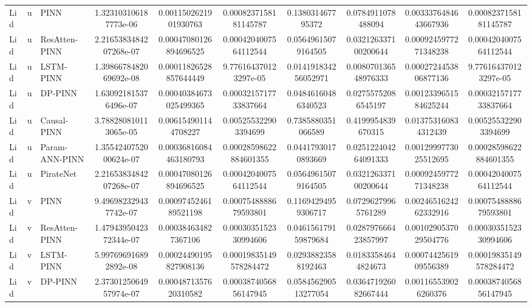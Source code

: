 \begin{landscape}
\begin{longtable}{lllccccccc}
\bottomrule
\endlastfoot
 Lid &     u &           PINN &  1.323103106187773e-06 &  0.0011502621901930763 &  0.0008237158181145787 &    0.138031467795372 &    0.0784911078488094 & 0.0033376484643667936 &  0.0008237158181145787 \\
 Lid &     u &  ResAtten-PINN & 2.2165383484207268e-07 & 0.00047080126894696525 &  0.0004204007564112544 &  0.05649615079164505 &  0.032126337100200644 & 0.0009245977271348238 &  0.0004204007564112544 \\
 Lid &     u &      LSTM-PINN & 1.3986678482069692e-08 & 0.00011826528857644449 &  9.776164370123297e-05 & 0.014191834256052971 &  0.008070136548976333 & 0.0002724453806877136 &  9.776164370123297e-05 \\
 Lid &     u &        DP-PINN &  1.630921815376496e-07 & 0.00040384673025499365 &  0.0003215717733837664 &  0.04846160486340523 &   0.02755752086545197 & 0.0012339651584625244 &  0.0003215717733837664 \\
 Lid &     u &    Causal-PINN &  3.788280810113065e-05 &   0.006154901144708227 &   0.005255322903394699 &   0.7385880351066589 &    0.4199954839670315 &  0.013753160834312439 &   0.005255322903394699 \\
 Lid &     u & Param-ANN-PINN & 1.3554240752000624e-07 & 0.00036816084463180793 & 0.00028598622884601355 &  0.04417930170893669 &  0.025122404264091333 & 0.0012999773025512695 & 0.00028598622884601355 \\
 Lid &     u &      PirateNet & 2.2165383484207268e-07 & 0.00047080126894696525 &  0.0004204007564112544 &  0.05649615079164505 &  0.032126337100200644 & 0.0009245977271348238 &  0.0004204007564112544 \\
 Lid &     v &           PINN &  9.496982329437742e-07 &  0.0009745246189521198 &  0.0007548888679593801 &  0.11694294959306717 &   0.07296279965761289 & 0.0024651624262332916 &  0.0007548888679593801 \\
 Lid &     v &  ResAtten-PINN & 1.4794395042372344e-07 &   0.000384634827367106 &  0.0003035152330994606 & 0.046156179159879684 &  0.028797666423857997 & 0.0010290537029504776 &  0.0003035152330994606 \\
 Lid &     v &      LSTM-PINN &  5.997696916892892e-08 & 0.00024490195827908136 & 0.00019835149578284472 &  0.02938823588192463 &   0.01833584644824673 & 0.0007442561909556389 & 0.00019835149578284472 \\
 Lid &     v &        DP-PINN & 2.3730125064957974e-07 &  0.0004871357620310582 &  0.0003874056856147945 & 0.058456290513277054 &  0.036471926082667444 &  0.001165539026260376 &  0.0003874056856147945 \\

\end{longtable}
\end{landscape}
